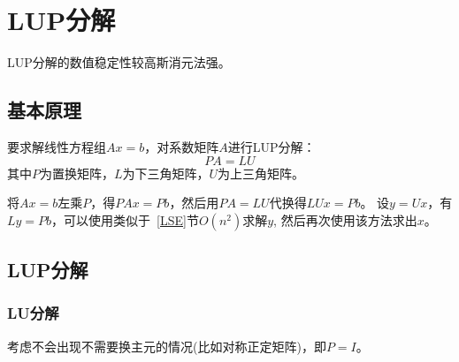 \section{LUP分解}
LUP分解的数值稳定性较高斯消元法强。
\subsection{基本原理}
要求解线性方程组$Ax=b$，对系数矩阵$A$进行LUP分解：
\begin{displaymath}
	PA=LU
\end{displaymath}
其中$P$为置换矩阵，$L$为下三角矩阵，$U$为上三角矩阵。

将$Ax=b$左乘$P$，得$PAx=Pb$，然后用$PA=LU$代换得$LUx=Pb$。
设$y=Ux$，有$Ly=Pb$，可以使用类似于~\ref{LSE}节$O(n^2)$求解$y$,
然后再次使用该方法求出$x$。

\subsection{LUP分解}
\subsubsection{LU分解}
考虑不会出现不需要换主元的情况(比如对称正定矩阵)，即$P=I$。

